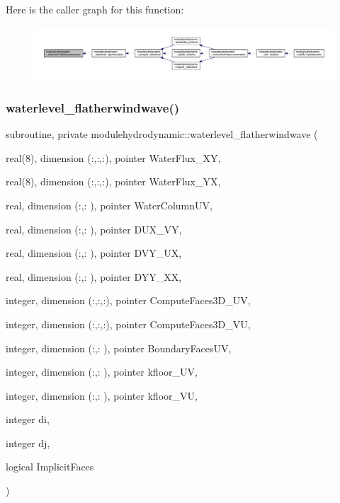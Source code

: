 Here is the caller graph for this function\+:\nopagebreak
\begin{figure}[H]
\begin{center}
\leavevmode
\includegraphics[width=350pt]{namespacemodulehydrodynamic_a9e27696e9df4a46aae637e4ecb5bb626_icgraph}
\end{center}
\end{figure}
\mbox{\label{namespacemodulehydrodynamic_a31821bc82ef6a38083be92796ac733a3}} 
\subsubsection{\texorpdfstring{waterlevel\+\_\+flatherwindwave()}{waterlevel\_flatherwindwave()}}
{\footnotesize\ttfamily subroutine, private modulehydrodynamic\+::waterlevel\+\_\+flatherwindwave (\begin{DoxyParamCaption}\item[{real(8), dimension (\+:,\+:,\+:), pointer}]{Water\+Flux\+\_\+\+XY,  }\item[{real(8), dimension (\+:,\+:,\+:), pointer}]{Water\+Flux\+\_\+\+YX,  }\item[{real, dimension (\+:,\+:  ), pointer}]{Water\+Column\+UV,  }\item[{real, dimension (\+:,\+:  ), pointer}]{D\+U\+X\+\_\+\+VY,  }\item[{real, dimension (\+:,\+:  ), pointer}]{D\+V\+Y\+\_\+\+UX,  }\item[{real, dimension (\+:,\+:  ), pointer}]{D\+Y\+Y\+\_\+\+XX,  }\item[{integer, dimension (\+:,\+:,\+:), pointer}]{Compute\+Faces3\+D\+\_\+\+UV,  }\item[{integer, dimension (\+:,\+:,\+:), pointer}]{Compute\+Faces3\+D\+\_\+\+VU,  }\item[{integer, dimension (\+:,\+:  ), pointer}]{Boundary\+Faces\+UV,  }\item[{integer, dimension (\+:,\+:  ), pointer}]{kfloor\+\_\+\+UV,  }\item[{integer, dimension (\+:,\+:  ), pointer}]{kfloor\+\_\+\+VU,  }\item[{integer}]{di,  }\item[{integer}]{dj,  }\item[{logical}]{Implicit\+Faces }\end{DoxyParamCaption})\hspace{0.3cm}{\ttfamily [private]}}

